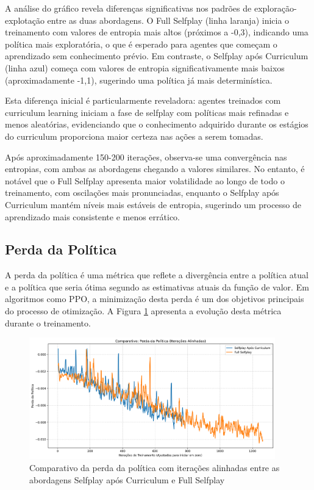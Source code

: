 A análise do gráfico revela diferenças significativas nos padrões de exploração-explotação entre as duas abordagens. O Full Selfplay (linha laranja) inicia o treinamento com valores de entropia mais altos (próximos a -0,3), indicando uma política mais exploratória, o que é esperado para agentes que começam o aprendizado sem conhecimento prévio. Em contraste, o Selfplay após Curriculum (linha azul) começa com valores de entropia significativamente mais baixos (aproximadamente -1,1), sugerindo uma política já mais determinística.

Esta diferença inicial é particularmente reveladora: agentes treinados com curriculum learning iniciam a fase de selfplay com políticas mais refinadas e menos aleatórias, evidenciando que o conhecimento adquirido durante os estágios do curriculum proporciona maior certeza nas ações a serem tomadas.

Após aproximadamente 150-200 iterações, observa-se uma convergência nas entropias, com ambas as abordagens chegando a valores similares. No entanto, é notável que o Full Selfplay apresenta maior volatilidade ao longo de todo o treinamento, com oscilações mais pronunciadas, enquanto o Selfplay após Curriculum mantém níveis mais estáveis de entropia, sugerindo um processo de aprendizado mais consistente e menos errático.

\subsection{Perda da Política}

A perda da política é uma métrica que reflete a divergência entre a política atual e a política que seria ótima segundo as estimativas atuais da função de valor. Em algoritmos como PPO, a minimização desta perda é um dos objetivos principais do processo de otimização. A Figura \ref{fig:policy_loss} apresenta a evolução desta métrica durante o treinamento.

\begin{figure}[H]
    \centering
    \includegraphics[width=0.95\textwidth]{fig/graficos_trabalho/graficos_experimentos/geral/comparativo_perda_politica_alinhado.png}
    \caption{Comparativo da perda da política com iterações alinhadas entre as abordagens Selfplay após Curriculum e Full Selfplay}
    \label{fig:policy_loss}
\end{figure}

